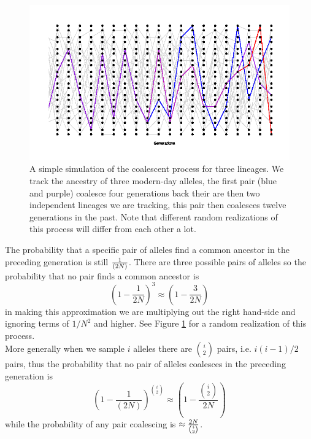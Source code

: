 \begin{figure}
\begin{center}
  \includegraphics[width = \textwidth]{figures/Coalescent_3.png}
\end{center}
\caption{A simple simulation of the coalescent process for three
  lineages. We track the ancestry of 
  three modern-day alleles, the first pair (blue and purple) coalesce four generations back 
  their are then two independent lineages we are tracking, this pair
  then coalesces twelve generations in the past. Note that different
  random realizations of this process will differ from each other a lot.} \label{fig:Coalescent_simulation_3}
\end{figure}

The probability that a specific pair of alleles find a common ancestor in the
preceding generation is still $\nicefrac{1}{(2N)}$. There are three possible pairs of
alleles so the probability that no pair finds a common ancestor is
\begin{equation}
\left(1-\frac{1}{2N} \right)^3 \approx \left( 1- \frac{3}{2N} \right)
\end{equation}
in making this approximation we are multiplying out the right hand-side
and ignoring terms of $1/N^2$ and higher. See
Figure \ref{fig:Coalescent_simulation_3} for a random realization of this process. \\


More generally when we sample $i$ alleles there are ${i \choose
 2}$ pairs, i.e. $i(i-1)/2$ pairs, thus the probability that no pair
of alleles coalesces in the preceding generation is
\begin{equation}
\left(1-\frac{1}{(2N)} \right)^{{i \choose
 2}} \approx \left( 1- \frac{{i \choose
 2}}{2N}\right)
\end{equation}
while the probability of any pair coalescing is $\approx \nicefrac{2N}{{i \choose
 2}}$.\\

